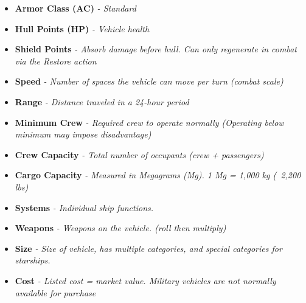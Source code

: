 

\begin{scifitablebox}[screenbox, title=\textcolor{PanelGlow}{Vehicle Stats}]
\begin{itemize}
    \item \textbf{Armor Class (AC)} \textit{- Standard}
    \item \textbf{Hull Points (HP)} \textit{- Vehicle health}
    \item \textbf{Shield Points} \textit{- Absorb damage before hull. Can only regenerate in combat via the Restore action}
    \item \textbf{Speed} \textit{- Number of spaces the vehicle can move per turn (combat scale)}
    \item \textbf{Range} \textit{- Distance traveled in a 24-hour period}
    \item \textbf{Minimum Crew} \textit{- Required crew to operate normally (Operating below minimum may impose disadvantage)}
    \item \textbf{Crew Capacity} \textit{- Total number of occupants (crew + passengers)}
    \item \textbf{Cargo Capacity} \textit{- Measured in Megagrams (Mg). 1 Mg = 1,000 kg (~2,200 lbs)}
    \item \textbf{Systems} \textit{- Individual ship functions.}
    \item \textbf{Weapons} \textit{- Weapons on the vehicle. (roll then multiply)}
    \item \textbf{Size} \textit{- Size of vehicle, has multiple categories, and special categories for starships.}
    \item \textbf{Cost} \textit{- Listed cost = market value. Military vehicles are not normally available for purchase}
\end{itemize}
\end{scifitablebox}



